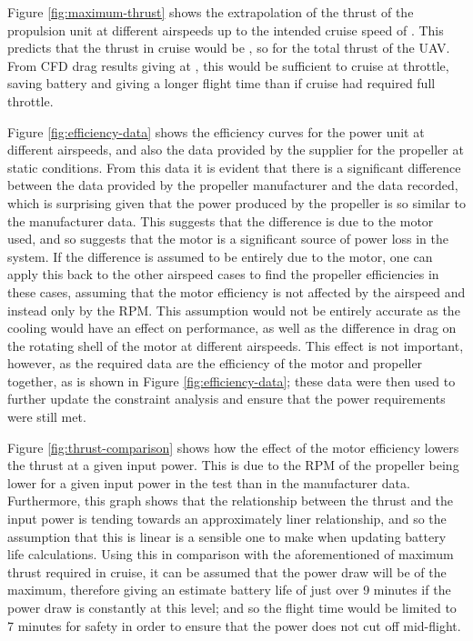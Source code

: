 \documentclass[../../main.tex]{subfiles}
\begin{document}
Figure \ref{fig:maximum-thrust} shows the extrapolation of the thrust of the propulsion unit at different airspeeds up to the intended cruise speed of .
This predicts that the thrust in cruise would be , so  for the total thrust of the UAV.
From CFD drag results giving  at , this would be sufficient to cruise at  throttle, saving battery and giving a longer flight time than if cruise had required full throttle. 


Figure \ref{fig:efficiency-data} shows the efficiency curves for the power unit at different airspeeds, and also the data provided by the supplier for the propeller at static conditions.
From this data it is evident that there is a significant difference between the data provided by the propeller manufacturer and the data recorded, which is surprising given that the power produced by the propeller is so similar to the manufacturer data.
This suggests that the difference is due to the motor used, and so suggests that the motor is a significant source of power loss in the system.
If the difference is assumed to be entirely due to the motor, one can apply this back to the other airspeed cases to find the propeller efficiencies in these cases, assuming that the motor efficiency is not affected by the airspeed and instead only by the RPM.
This assumption would not be entirely accurate as the cooling would have an effect on performance, as well as the difference in drag on the rotating shell of the motor at different airspeeds.
This effect is not important, however, as the required data are the efficiency of the motor and propeller together, as is shown in Figure \ref{fig:efficiency-data}; these data were then used to further update the constraint analysis and ensure that the power requirements were still met. 


Figure \ref{fig:thrust-comparison} shows how the effect of the motor efficiency lowers the thrust at a given input power.
This is due to the RPM of the propeller being lower for a given input power in the test than in the manufacturer data.
Furthermore, this graph shows that the relationship between the thrust and the input power is tending towards an approximately liner relationship, and so the assumption that this is linear is a sensible one to make when updating battery life calculations.
Using this in comparison with the aforementioned  of maximum thrust required in cruise, it can be assumed that the power draw will be  of the maximum, therefore giving an estimate battery life of just over 9 minutes if the power draw is constantly at this level; and so the flight time would be limited to 7 minutes for safety in order to ensure that the power does not cut off mid-flight. 
\end{document}
